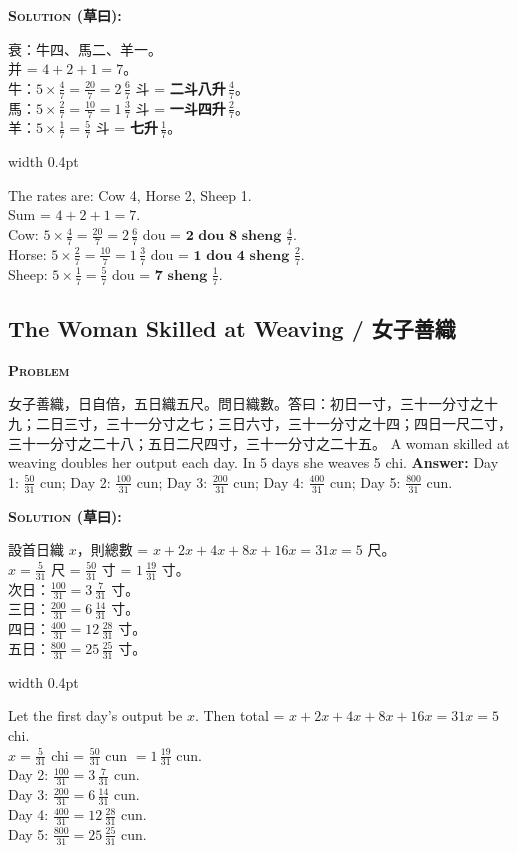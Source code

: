 \documentclass[10pt,a4paper]{article}
\newcommand{\zh}[1]{{\CJKfamily{notocjksc}#1}}
\newcommand{\bilingual}[2]{%
  \par\smallskip\noindent%
  \begin{minipage}[t]{0.47\textwidth}%
    \RaggedRight\small #1%
  \end{minipage}%
  \hfill\vrule width 0.4pt\hfill%
  \begin{minipage}[t]{0.47\textwidth}%
    \RaggedRight\small #2%
  \end{minipage}%
  \par\smallskip%
}
\newenvironment{biproblem}[2][]{%
  \par\smallskip\vspace{1.5ex}%
  \noindent\textbf{\textcolor{problemframe}{\textsc{Problem} #1}}\par\smallskip
  \bgroup\small%
}{%
  \egroup\par\smallskip
}
\newenvironment{bisolution}{%
  \par\smallskip\noindent\textbf{\textcolor{notecolor}{\textsc{Solution} (草曰):}}\par\smallskip\itshape\small%
}{%
  \par\smallskip\normalfont%
}
\begin{document}
\begin{bisolution}
\bilingual{
  衰：牛四、馬二、羊一。\\
  并 = $4 + 2 + 1 = 7$。\\
  牛：$5 \times \frac{4}{7} = \frac{20}{7} = 2\,\frac{6}{7}$ 斗 = \textbf{二斗八升$\,\frac{4}{7}$}。\\
  馬：$5 \times \frac{2}{7} = \frac{10}{7} = 1\,\frac{3}{7}$ 斗 = \textbf{一斗四升$\,\frac{2}{7}$}。\\
  羊：$5 \times \frac{1}{7} = \frac{5}{7}$ 斗 = \textbf{七升$\,\frac{1}{7}$}。
}{%
  The rates are: Cow 4, Horse 2, Sheep 1.\\
  Sum = $4 + 2 + 1 = 7$.\\
  Cow: $5 \times \frac{4}{7} = \frac{20}{7} = 2\,\frac{6}{7}$ dou = $\textbf{2 dou 8 sheng }\frac{4}{7}$.\\
  Horse: $5 \times \frac{2}{7} = \frac{10}{7} = 1\,\frac{3}{7}$ dou = $\textbf{1 dou 4 sheng }\frac{2}{7}$.\\
  Sheep: $5 \times \frac{1}{7} = \frac{5}{7}$ dou = $\textbf{7 sheng }\frac{1}{7}$.
}
\end{bisolution}

\subsection{The Woman Skilled at Weaving / 女子善織}

\begin{biproblem}
\bilingual{
  \zh{女子善織，日自倍，五日織五尺。問日織數。答曰：初日一寸，三十一分寸之十九；二日三寸，三十一分寸之七；三日六寸，三十一分寸之十四；四日一尺二寸，三十一分寸之二十八；五日二尺四寸，三十一分寸之二十五。}
}{%
  A woman skilled at weaving doubles her output each day. In 5 days she weaves 5 chi. \textbf{Answer:} Day 1: $\frac{50}{31}$ cun; Day 2: $\frac{100}{31}$ cun; Day 3: $\frac{200}{31}$ cun; Day 4: $\frac{400}{31}$ cun; Day 5: $\frac{800}{31}$ cun.
}
\end{biproblem}

\begin{bisolution}
\bilingual{
  設首日織 $x$，則總數 = $x + 2x + 4x + 8x + 16x = 31x = 5$ 尺。\\
  $x = \frac{5}{31}$ 尺 = $\frac{50}{31}$ 寸 = $1\,\frac{19}{31}$ 寸。\\
  次日：$\frac{100}{31} = 3\,\frac{7}{31}$ 寸。\\
  三日：$\frac{200}{31} = 6\,\frac{14}{31}$ 寸。\\
  四日：$\frac{400}{31} = 12\,\frac{28}{31}$ 寸。\\
  五日：$\frac{800}{31} = 25\,\frac{25}{31}$ 寸。
}{%
  Let the first day's output be $x$. Then total = $x + 2x + 4x + 8x + 16x = 31x = 5$ chi.\\
  $x = \frac{5}{31}$ chi = $\frac{50}{31}$ cun $= 1\,\frac{19}{31}$ cun.\\
  Day 2: $\frac{100}{31} = 3\,\frac{7}{31}$ cun.\\
  Day 3: $\frac{200}{31} = 6\,\frac{14}{31}$ cun.\\
  Day 4: $\frac{400}{31} = 12\,\frac{28}{31}$ cun.\\
  Day 5: $\frac{800}{31} = 25\,\frac{25}{31}$ cun.
}
\end{bisolution}
\end{document}
